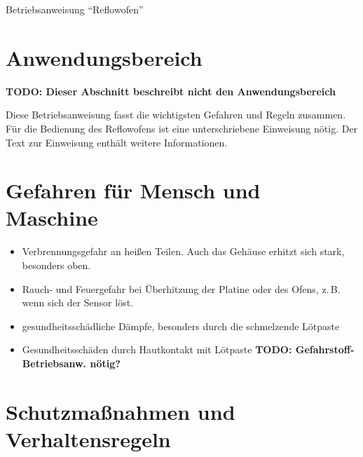 \documentclass[fontsize=11pt]{scrartcl}
\newcommand{\todo}[1]{\textbf{\color{red}TODO: #1 }}
\begin{document}

\begin{center}
	\LARGE{Betriebsanweisung \enquote{Reflowofen}}
\end{center}


\section{Anwendungsbereich}
\todo{Dieser Abschnitt beschreibt nicht den Anwendungsbereich}
\begin{center}
	Diese Betriebsanweisung fasst die wichtigsten Gefahren und Regeln zusammen.\\
	Für die Bedienung des Reflowofens ist eine unterschriebene Einweisung nötig. Der Text zur Einweisung enthält weitere Informationen.
\end{center}



\section{Gefahren für Mensch und Maschine}

\begin{itemize}
	\item Verbrennungsgefahr an heißen Teilen. Auch das Gehäuse erhitzt sich stark, besonders oben.
	\item Rauch- und Feuergefahr bei Überhitzung der Platine oder des Ofens, z.\,B. wenn sich der Sensor löst.
	\item gesundheitsschädliche Dämpfe, besonders durch die schmelzende Lötpaste
	\item Gesundheitsschäden durch Hautkontakt mit Lötpaste \todo{Gefahrstoff-Betriebsanw. nötig?}
\end{itemize}
\section{Schutzmaßnahmen und Verhaltensregeln}
\end{document}
